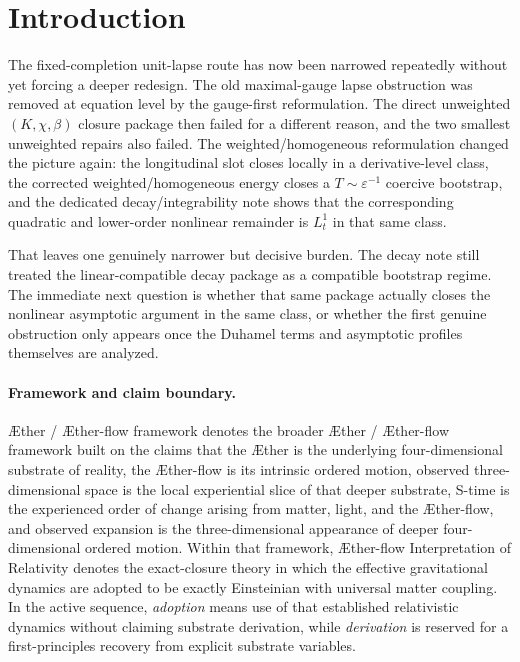 \documentclass[11pt]{article}
\newcommand{\Aether}{\AE{}ther}
\newcommand{\Aflow}{\AE{}ther-flow}
\newcommand{\TheoryName}{\Aflow{} Interpretation of Relativity}
\newcommand{\TheoryProgram}{\Aether{} / \Aflow{} framework}
\begin{document}
\section{Introduction}

The fixed-completion unit-lapse route has now been narrowed repeatedly without yet forcing a deeper redesign. The old maximal-gauge lapse obstruction was removed at equation level by the gauge-first reformulation. The direct unweighted \((K,\chi,\beta)\) closure package then failed for a different reason, and the two smallest unweighted repairs also failed. The weighted/homogeneous reformulation changed the picture again: the longitudinal slot closes locally in a derivative-level class, the corrected weighted/homogeneous energy closes a \(T\sim \varepsilon^{-1}\) coercive bootstrap, and the dedicated decay/integrability note shows that the corresponding quadratic and lower-order nonlinear remainder is \(L_t^1\) in that same class.

That leaves one genuinely narrower but decisive burden. The decay note still treated the linear-compatible decay package as a compatible bootstrap regime. The immediate next question is whether that same package actually closes the nonlinear asymptotic argument in the same class, or whether the first genuine obstruction only appears once the Duhamel terms and asymptotic profiles themselves are analyzed.

\paragraph{Framework and claim boundary.}
\TheoryProgram{} denotes the broader \Aether{} / \Aflow{} framework built on the claims that the \Aether{} is the underlying four-dimensional substrate of reality, the \Aflow{} is its intrinsic ordered motion, observed three-dimensional space is the local experiential slice of that deeper substrate, S-time is the experienced order of change arising from matter, light, and the \Aflow{}, and observed expansion is the three-dimensional appearance of deeper four-dimensional ordered motion. Within that framework, \TheoryName{} denotes the exact-closure theory in which the effective gravitational dynamics are adopted to be exactly Einsteinian with universal matter coupling. In the active sequence, \emph{adoption} means use of that established relativistic dynamics without claiming substrate derivation, while \emph{derivation} is reserved for a first-principles recovery from explicit substrate variables.
\end{document}
